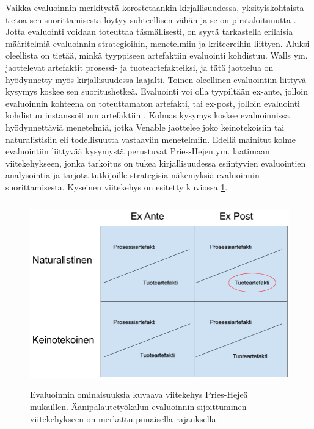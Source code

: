 \documentclass[utf8]{gradu3}
\begin{document}
Vaikka evaluoinnin merkitystä korostetaankin kirjallisuudessa, yksityiskohtaista tietoa sen suorittamisesta löytyy suhteellisen vähän ja se on pirstaloitunutta \parencite{pries, comprehensive, evaluation}. Jotta evaluointi voidaan toteuttaa täsmällisesti, on syytä tarkastella erilaisia määritelmiä evaluoinnin strategioihin, menetelmiin ja kriteereihin liittyen. Aluksi oleellista on tietää, minkä tyyppiseen artefaktiin evaluointi kohdistuu. Walls ym. \parencite*{walls} jaottelevat artefaktit prosessi- ja tuoteartefakteiksi, ja tätä jaottelua on hyödynnetty myös kirjallisuudessa laajalti. Toinen oleellinen evaluointiin liittyvä kysymys koskee sen suoritushetkeä. Evaluointi voi olla tyypiltään ex-ante, jolloin evaluoinnin kohteena on toteuttamaton artefakti, tai ex-post, jolloin evaluointi kohdistuu instanssoituun artefaktiin \parencite{pries}. Kolmas kysymys koskee evaluoinnissa hyödynnettäviä menetelmiä, jotka Venable \parencite*{venable} jaottelee joko keinotekoisiin tai naturalistisiin eli todellisuutta vastaaviin menetelmiin. Edellä mainitut kolme evaluointiin liittyvää kysymystä perustuvat Pries-Hejen ym. \parencite*{pries} laatimaan viitekehykseen, jonka tarkoitus on tukea kirjallisuudessa esiintyvien evaluointien analysointia ja tarjota tutkijoille strategisia näkemyksiä evaluoinnin suorittamisesta. Kyseinen viitekehys on esitetty kuviossa \ref{fig:heje}.

\begin{figure}[H]\centering
  \includegraphics[height=8cm,keepaspectratio]{heje}
  \caption{Evaluoinnin ominaisuuksia kuvaava viitekehys Pries-Hejeä \parencite*{pries} mukaillen. Äänipalautetyökalun evaluoinnin sijoittuminen viitekehykseen on merkattu punaisella rajauksella.}
  \label{fig:heje}
\end{figure}
\end{document}
